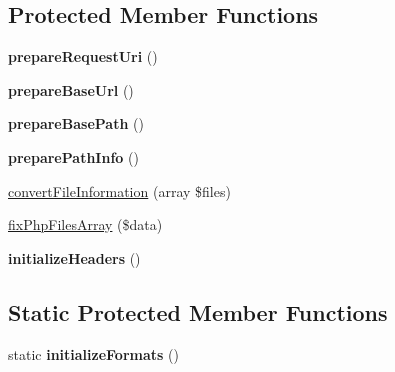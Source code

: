 \subsection*{\-Protected \-Member \-Functions}
\begin{DoxyCompactItemize}
\item 
\hypertarget{class_symfony_1_1_component_1_1_http_foundation_1_1_request_ab1251ea0d460353df3cbaba8aaa92b59}{
{\bfseries prepare\-Request\-Uri} ()}
\label{class_symfony_1_1_component_1_1_http_foundation_1_1_request_ab1251ea0d460353df3cbaba8aaa92b59}

\item 
\hypertarget{class_symfony_1_1_component_1_1_http_foundation_1_1_request_a2d2e1f25dba959c7531afb7152f0418a}{
{\bfseries prepare\-Base\-Url} ()}
\label{class_symfony_1_1_component_1_1_http_foundation_1_1_request_a2d2e1f25dba959c7531afb7152f0418a}

\item 
\hypertarget{class_symfony_1_1_component_1_1_http_foundation_1_1_request_af26b6987b6a8af8abcbb665acd838ece}{
{\bfseries prepare\-Base\-Path} ()}
\label{class_symfony_1_1_component_1_1_http_foundation_1_1_request_af26b6987b6a8af8abcbb665acd838ece}

\item 
\hypertarget{class_symfony_1_1_component_1_1_http_foundation_1_1_request_ab1b2dd995c3e4228bef63ec7664e1e14}{
{\bfseries prepare\-Path\-Info} ()}
\label{class_symfony_1_1_component_1_1_http_foundation_1_1_request_ab1b2dd995c3e4228bef63ec7664e1e14}

\item 
\hyperlink{class_symfony_1_1_component_1_1_http_foundation_1_1_request_aa315f60c364c80b457261e8424a1c0b9}{convert\-File\-Information} (array \$files)
\item 
\hyperlink{class_symfony_1_1_component_1_1_http_foundation_1_1_request_a25b4debae47aba411a3fa66f03a0b339}{fix\-Php\-Files\-Array} (\$data)
\item 
\hypertarget{class_symfony_1_1_component_1_1_http_foundation_1_1_request_a7b5d65fff7660725e7b74ec96e20bb18}{
{\bfseries initialize\-Headers} ()}
\label{class_symfony_1_1_component_1_1_http_foundation_1_1_request_a7b5d65fff7660725e7b74ec96e20bb18}

\end{DoxyCompactItemize}
\subsection*{\-Static \-Protected \-Member \-Functions}
\begin{DoxyCompactItemize}
\item 
\hypertarget{class_symfony_1_1_component_1_1_http_foundation_1_1_request_a6c5270978973956bbdddadb329c541ef}{
static {\bfseries initialize\-Formats} ()}
\label{class_symfony_1_1_component_1_1_http_foundation_1_1_request_a6c5270978973956bbdddadb329c541ef}

\end{DoxyCompactItemize}
